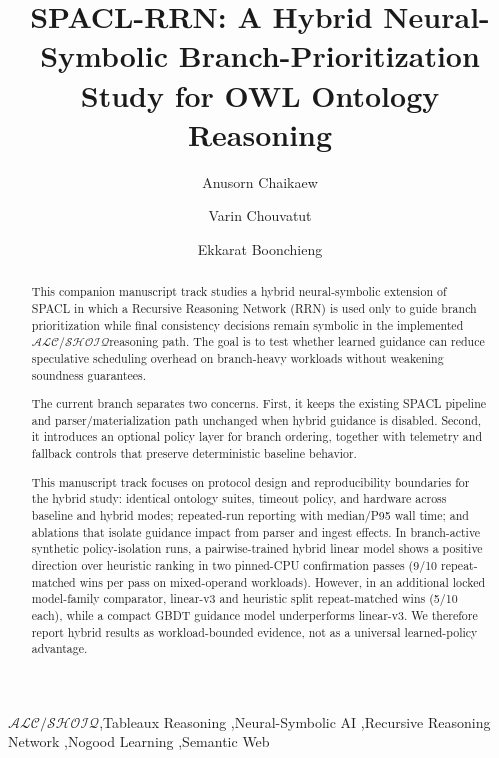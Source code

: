 \documentclass[preprint,12pt,times]{elsarticle}
\newcommand{\dlfrag}{\ensuremath{\mathcal{ALC/SHOIQ}}}
\begin{document}
\begin{frontmatter}

\title{SPACL-RRN: A Hybrid Neural-Symbolic Branch-Prioritization Study for OWL Ontology Reasoning}

\author[1]{Anusorn Chaikaew}

\author[1]{Varin Chouvatut}

\author[1]{Ekkarat Boonchieng}



\begin{abstract}
This companion manuscript track studies a hybrid neural-symbolic extension of SPACL in which a Recursive Reasoning Network (RRN) is used only to guide branch prioritization while final consistency decisions remain symbolic in the implemented \dlfrag reasoning path. The goal is to test whether learned guidance can reduce speculative scheduling overhead on branch-heavy workloads without weakening soundness guarantees.

The current branch separates two concerns. First, it keeps the existing SPACL pipeline and parser/materialization path unchanged when hybrid guidance is disabled. Second, it introduces an optional policy layer for branch ordering, together with telemetry and fallback controls that preserve deterministic baseline behavior.

This manuscript track focuses on protocol design and reproducibility boundaries for the hybrid study: identical ontology suites, timeout policy, and hardware across baseline and hybrid modes; repeated-run reporting with median/P95 wall time; and ablations that isolate guidance impact from parser and ingest effects. In branch-active synthetic policy-isolation runs, a pairwise-trained hybrid linear model shows a positive direction over heuristic ranking in two pinned-CPU confirmation passes (9/10 repeat-matched wins per pass on mixed-operand workloads). However, in an additional locked model-family comparator, linear-v3 and heuristic split repeat-matched wins (5/10 each), while a compact GBDT guidance model underperforms linear-v3. We therefore report hybrid results as workload-bounded evidence, not as a universal learned-policy advantage.
\end{abstract}

\begin{keyword}
\dlfrag \sep Tableaux Reasoning \sep Neural-Symbolic AI \sep Recursive Reasoning Network \sep Nogood Learning \sep Semantic Web
\end{keyword}

\end{frontmatter}
\end{document}
